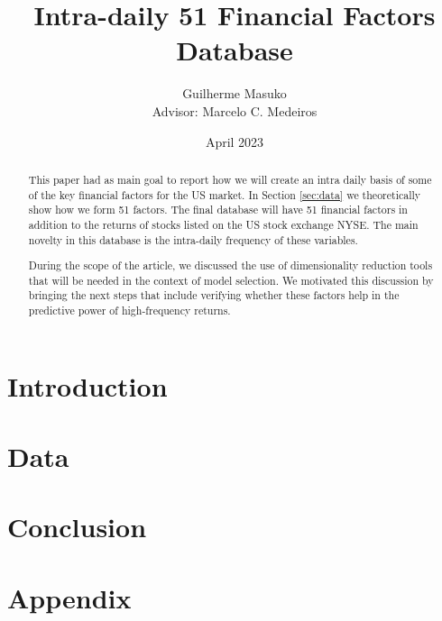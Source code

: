 \documentclass[12pt, a4paper]{article}
\title{Intra-daily 51 Financial Factors Database}
\author{Guilherme Masuko \\
Advisor: Marcelo C. Medeiros}
\date{April 2023}
\begin{document}
\begin{titlepage}
\clearpage
\maketitle
\thispagestyle{empty}
\begin{abstract}
	This paper had as main goal to report how we will create an intra daily basis of some of the key financial factors for the US market. In Section \ref{sec:data} we theoretically show how we form 51 factors. The final database will have 51 financial factors in addition to the returns of stocks listed on the US stock exchange NYSE. The main novelty in this database is the intra-daily frequency of these variables.
	
	During the scope of the article, we discussed the use of dimensionality reduction tools that will be needed in the context of model selection. We motivated this discussion by bringing the next steps that include verifying whether these factors help in the predictive power of high-frequency returns.
	
	
	
\end{abstract}
\end{titlepage}

	\section{Introduction} \label{sec:introduction}
	
	\section{Data} \label{sec:data}
	
	\section{Conclusion} \label{sec:conclusion}
	
	\newpage
	
	
	\newpage
	\appendix
	\section{Appendix} \label{sec:appendix}
	
\end{document}
